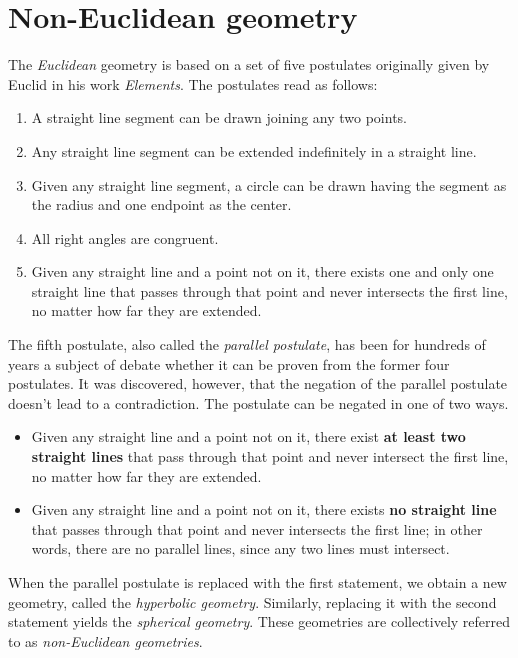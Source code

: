 \section{Non-Euclidean geometry}

The \textit{Euclidean} geometry is based on a set of five postulates originally given by Euclid in his work \textit{Elements}.
The postulates read as follows:
\begin{enumerate}
    \item A straight line segment can be drawn joining any two points.
    \item Any straight line segment can be extended indefinitely in a straight line.
    \item Given any straight line segment, a circle can be drawn having the segment as the radius and one endpoint as the center.
    \item All right angles are congruent.
    \item Given any straight line and a point not on it, there exists one and only one straight line that passes through that point and never intersects the first line, no matter how far they are extended.
\end{enumerate}
The fifth postulate, also called the \textit{parallel postulate}, has been for hundreds of years a subject of debate whether it can be proven from the former four postulates.
It was discovered, however, that the negation of the parallel postulate doesn't lead to a contradiction.
The postulate can be negated in one of two ways.
\begin{itemize}
    \item Given any straight line and a point not on it, there exist \textbf{at least two straight lines} that pass through that point and never intersect the first line, no matter how far they are extended.
    \item Given any straight line and a point not on it, there exists \textbf{no straight line} that passes through that point and never intersects the first line; in other words, there are no parallel lines, since any two lines must intersect.
\end{itemize}

When the parallel postulate is replaced with the first statement, we obtain a new geometry, called the \textit{hyperbolic geometry}.
Similarly, replacing it with the second statement yields the \textit{spherical geometry}.
These geometries are collectively referred to as \textit{non-Euclidean geometries}.


